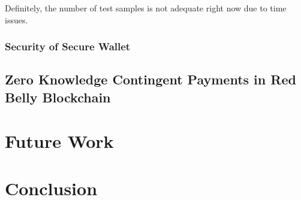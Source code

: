 \documentclass[12pt]{article}
\begin{document}
Definitely, the number of test samples is not adequate right now due to time issues. 

\subsubsection{Security of Secure Wallet}

\subsection{Zero Knowledge Contingent Payments in Red Belly Blockchain}

\section{Future Work}

\section{Conclusion}



\newpage


\end{document}
